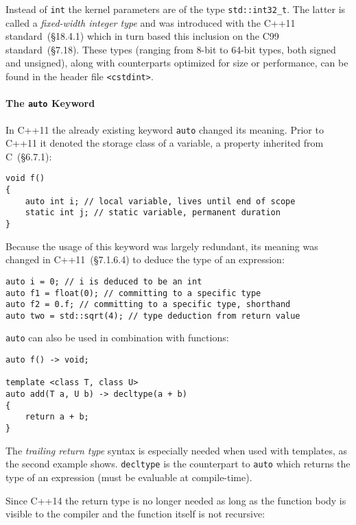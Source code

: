 Instead of \texttt{int} the kernel parameters are of the type \texttt{std::int32\_t}. The latter is called a \textit{fixed-width integer type} and was introduced with the C++11 standard~\cite{cpp11std}(§18.4.1) which in turn based this inclusion on the C99 standard~\cite{c99std}(§7.18). These types (ranging from 8-bit to 64-bit types, both signed and unsigned), along with counterparts optimized for size or performance, can be found in the header file \texttt{<cstdint>}.

\paragraph{The \texttt{auto} Keyword}

In C++11 the already existing keyword \texttt{auto} changed its meaning. Prior to C++11 it denoted the storage class of a variable, a property inherited from C~\cite{c99std}(§6.7.1):

\begin{verbatim}
void f()
{
    auto int i; // local variable, lives until end of scope
    static int j; // static variable, permanent duration
}
\end{verbatim}

\noindent Because the usage of this keyword was largely redundant, its meaning was changed in C++11~\cite{cpp11std}(§7.1.6.4) to deduce the type of an expression:

\begin{verbatim}
auto i = 0; // i is deduced to be an int
auto f1 = float(0); // committing to a specific type
auto f2 = 0.f; // committing to a specific type, shorthand
auto two = std::sqrt(4); // type deduction from return value
\end{verbatim}

\noindent\texttt{auto} can also be used in combination with functions:

\begin{verbatim}
auto f() -> void;

template <class T, class U>
auto add(T a, U b) -> decltype(a + b)
{
    return a + b;
}
\end{verbatim}

\noindent The \textit{trailing return type} syntax is especially needed when used with templates, as the second example shows. \texttt{decltype} is the counterpart to \texttt{auto} which returns the type of an expression (must be evaluable at compile-time).

Since C++14 the return type is no longer needed as long as the function body is visible to the compiler and the function itself is not recursive:


